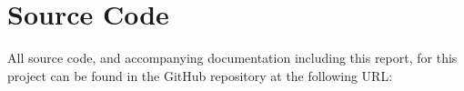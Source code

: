 \chapter{Source Code}
\label{appendix:src}

All source code, and accompanying documentation including this report, for this project can be found in the GitHub repository at the following URL: 


